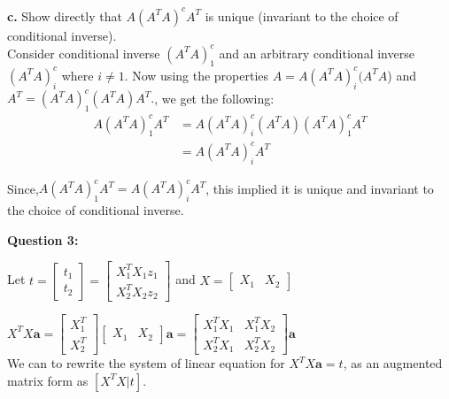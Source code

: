 \documentclass[12 pt, a4paper]{article}
\begin{document}
		
\noindent \textbf{c.} Show directly that $A(A^TA)^c A^T$ is unique (invariant to the choice of conditional inverse). \\

	

\noindent Consider conditional inverse $(A^TA)^c_1$ and an arbitrary conditional inverse $(A^TA)^c_i$ where $i\neq 1$. Now using the properties $A=A(A^TA)^c_i(A^TA$) and $A^T= (A^TA)^c_1(A^TA)A^T.$, we get the following:
\begin{align*}
A(A^TA)^c_1A^T&= A(A^TA)^c_i(A^TA)(A^TA)^c_1A^T\\
&=A(A^TA)^c_iA^T
\end{align*}

\noindent Since,$ A(A^TA)^c_1A^T=A(A^TA)^c_iA^T$, this implied it is unique and invariant to the choice of conditional inverse.


\pagebreak

\noindent \textbf{Question 3:}\\
\vspace{0.5cm}

Let $ t= \left[
\begin{array}{c}
t_1 \\
\hline
t_2
\end{array}
\right]=
\left[
\begin{array}{c}
X_1^TX_1z_1 \\
\hline
X_2^TX_2z_2
\end{array}
\right] $ and $X= \left[
\begin{array}{c|c}
X_1 & X_2
\end{array}
\right]$ \

\vspace{0.5cm}
$X^TX\textbf{a}=
 \left[
\begin{array}{c}
X_1^T\\
\hline
X_2^T
\end{array}
\right]
 \left[
\begin{array}{c|c}
X_1 & X_2
\end{array}
\right]
\textbf{a}=
 \left[
\begin{array}{c|c}
X_1^TX_1 & X_1^TX_2\\
\hline
X_2^TX_1 &X_2^TX_2
\end{array}
\right]\textbf{a}
$\\

\vspace{0.5cm}
\noindent We can to rewrite the system of linear equation for  $X^TX\textbf{a}=t$,  as an augmented matrix form as $[X^TX|t]$.\\
\end{document}
